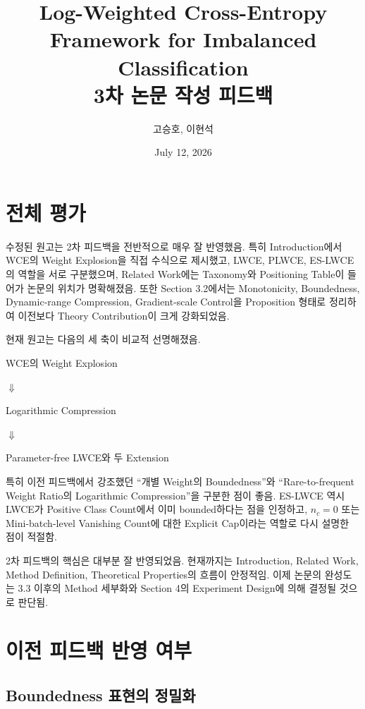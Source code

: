 \documentclass[11pt,a4paper]{article}
\title{\textbf{Log-Weighted Cross-Entropy Framework for Imbalanced Classification}\\
\vspace{5mm}
\large 3차 논문 작성 피드백}
\author{고승호, 이현석}
\date{July 12, 2026}
\begin{document}
\maketitle

\section{전체 평가}

수정된 원고는 2차 피드백을 전반적으로 매우 잘 반영했음. 특히 Introduction에서 WCE의 Weight Explosion을 직접 수식으로 제시했고, LWCE, PLWCE, ES-LWCE의 역할을 서로 구분했으며, Related Work에는 Taxonomy와 Positioning Table이 들어가 논문의 위치가 명확해졌음. 또한 Section 3.2에서는 Monotonicity, Boundedness, Dynamic-range Compression, Gradient-scale Control을 Proposition 형태로 정리하여 이전보다 Theory Contribution이 크게 강화되었음.

현재 원고는 다음의 세 축이 비교적 선명해졌음.

\begin{center}
WCE의 Weight Explosion

$\Downarrow$

Logarithmic Compression

$\Downarrow$

Parameter-free LWCE와 두 Extension
\end{center}

특히 이전 피드백에서 강조했던 ``개별 Weight의 Boundedness''와 ``Rare-to-frequent Weight Ratio의 Logarithmic Compression''을 구분한 점이 좋음. ES-LWCE 역시 LWCE가 Positive Class Count에서 이미 bounded하다는 점을 인정하고, \(n_c=0\) 또는 Mini-batch-level Vanishing Count에 대한 Explicit Cap이라는 역할로 다시 설명한 점이 적절함.

\begin{tcolorbox}[title=종합 판단]
2차 피드백의 핵심은 대부분 잘 반영되었음. 현재까지는 Introduction, Related Work, Method Definition, Theoretical Properties의 흐름이 안정적임. 이제 논문의 완성도는 3.3 이후의 Method 세부화와 Section 4의 Experiment Design에 의해 결정될 것으로 판단됨.
\end{tcolorbox}

\section{이전 피드백 반영 여부}

\subsection{Boundedness 표현의 정밀화}
\end{document}
